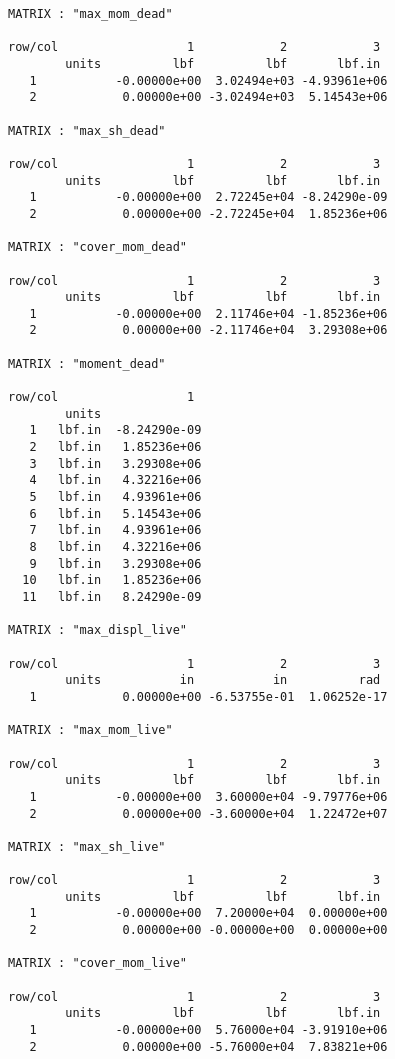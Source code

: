 \begin{footnotesize}
\begin{verbatim}
MATRIX : "max_mom_dead"

row/col                  1            2            3   
        units          lbf          lbf       lbf.in   
   1           -0.00000e+00  3.02494e+03 -4.93961e+06
   2            0.00000e+00 -3.02494e+03  5.14543e+06

MATRIX : "max_sh_dead"

row/col                  1            2            3   
        units          lbf          lbf       lbf.in   
   1           -0.00000e+00  2.72245e+04 -8.24290e-09
   2            0.00000e+00 -2.72245e+04  1.85236e+06

MATRIX : "cover_mom_dead"

row/col                  1            2            3   
        units          lbf          lbf       lbf.in   
   1           -0.00000e+00  2.11746e+04 -1.85236e+06
   2            0.00000e+00 -2.11746e+04  3.29308e+06

MATRIX : "moment_dead"

row/col                  1   
        units                
   1   lbf.in  -8.24290e-09
   2   lbf.in   1.85236e+06
   3   lbf.in   3.29308e+06
   4   lbf.in   4.32216e+06
   5   lbf.in   4.93961e+06
   6   lbf.in   5.14543e+06
   7   lbf.in   4.93961e+06
   8   lbf.in   4.32216e+06
   9   lbf.in   3.29308e+06
  10   lbf.in   1.85236e+06
  11   lbf.in   8.24290e-09

MATRIX : "max_displ_live"

row/col                  1            2            3   
        units           in           in          rad   
   1            0.00000e+00 -6.53755e-01  1.06252e-17

MATRIX : "max_mom_live"

row/col                  1            2            3   
        units          lbf          lbf       lbf.in   
   1           -0.00000e+00  3.60000e+04 -9.79776e+06
   2            0.00000e+00 -3.60000e+04  1.22472e+07

MATRIX : "max_sh_live"

row/col                  1            2            3   
        units          lbf          lbf       lbf.in   
   1           -0.00000e+00  7.20000e+04  0.00000e+00
   2            0.00000e+00 -0.00000e+00  0.00000e+00

MATRIX : "cover_mom_live"

row/col                  1            2            3   
        units          lbf          lbf       lbf.in   
   1           -0.00000e+00  5.76000e+04 -3.91910e+06
   2            0.00000e+00 -5.76000e+04  7.83821e+06


\end{verbatim}
\end{footnotesize}
